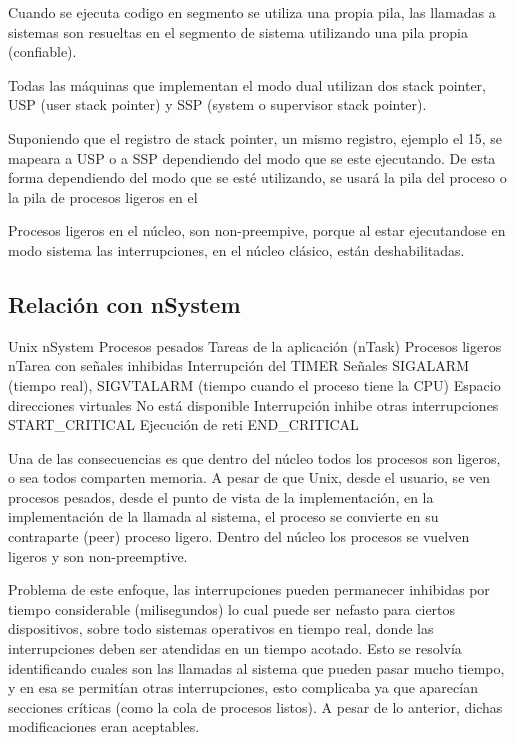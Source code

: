 Cuando se ejecuta codigo en segmento se utiliza una propia pila, las llamadas a sistemas son resueltas en el segmento de sistema utilizando una pila propia (confiable).


Todas las máquinas que implementan el modo dual utilizan dos stack pointer, USP (user stack pointer) y SSP (system o supervisor stack pointer).

Suponiendo que el registro de stack pointer, un mismo registro, ejemplo el 15, se mapeara a USP o a SSP dependiendo del modo que se este ejecutando. De esta forma dependiendo del modo que se esté utilizando, se usará la pila del proceso o la pila de procesos ligeros en el 

Procesos ligeros en el núcleo, son non-preempive, porque al estar ejecutandose en modo sistema las interrupciones, en el núcleo clásico, están deshabilitadas.

\subsection{Relación con nSystem}

Unix													nSystem
Procesos pesados							Tareas de la aplicación (nTask)
Procesos ligeros							nTarea con señales inhibidas
Interrupción del TIMER				Señales SIGALARM (tiempo real), SIGVTALARM (tiempo cuando el proceso tiene la CPU)
Espacio direcciones virtuales	No está disponible
Interrupción inhibe otras interrupciones			START\_CRITICAL
Ejecución de reti							END\_CRITICAL

Una de las consecuencias es que dentro del núcleo todos los procesos son ligeros, o sea todos comparten memoria. A pesar de que Unix, desde el usuario, se ven procesos pesados, desde el punto de vista de la implementación, en la implementación de la llamada al sistema, el proceso se convierte en su contraparte (peer) proceso ligero. Dentro del núcleo los procesos se vuelven ligeros y son non-preemptive. %

Problema de este enfoque, las interrupciones pueden permanecer inhibidas por tiempo considerable (milisegundos) lo cual puede ser nefasto para ciertos dispositivos, sobre todo sistemas operativos en tiempo real, donde las interrupciones deben ser atendidas en un tiempo acotado. Esto se resolvía identificando cuales son las llamadas al sistema que pueden pasar mucho tiempo, y en esa se permitían otras interrupciones, esto complicaba ya que aparecían secciones críticas (como la cola de procesos listos). A pesar de lo anterior, dichas modificaciones eran aceptables.

